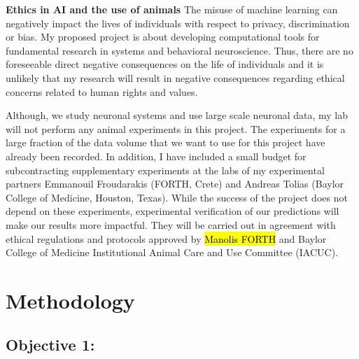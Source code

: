 \documentclass[B2,COG]{ercgrant}
\begin{document}
\textbf{Ethics in AI and the use of animals}
The misuse of machine learning can negatively impact the lives of individuals with respect to privacy, discrimination or bias. 
My proposed project is about developing computational tools for fundamental research in systems and behavioral neuroscience. 
Thus, there are no foreseeable direct negative consequences on the life of individuals and it is unlikely that my research will result in negative consequences regarding ethical concerns related to human rights and values.

Although, we study neuronal systems and use large scale neuronal data, my lab will not perform any animal experiments in this project. 
The experiments for a large fraction of the data volume that we want to use for this project have already been recorded. 
In addition, I have included a small budget for subcontracting supplementary experiments at the labs of my experimental partners Emmanouil Froudarakis (FORTH, Crete) and Andreas Tolias (Baylor College of Medicine, Houston, Texas).  
While the success of the project does not depend on these experiments, experimental verification of our predictions will make our results more impactful. 
They will be carried out in agreement with ethical regulations and protocols approved by \hl{Manolis FORTH} and Baylor College of Medicine Institutional Animal Care and Use Committee (IACUC).
\section{Methodology}
\subsection{\colorbox{obj1}{\color{white}Objective 1}: \oonetitle}
\end{document}
